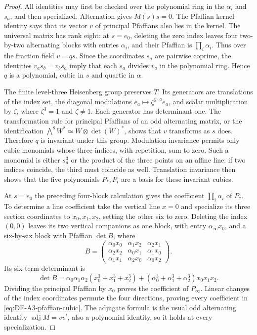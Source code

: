 \begin{proof}
All identities may first be checked over the polynomial ring in the
$\alpha_i$ and $s_a$, and then specialized.  Alternation gives $M(s)s=0$.
The Pfaffian kernel identity says that its vector $v$ of principal
Pfaffians also lies in the kernel.  The universal matrix has rank eight:
at $s=e_0$, deleting the zero index leaves four two-by-two alternating
blocks with entries $\alpha_i$, and their Pfaffian is
$\prod_i\alpha_i$.  Thus over the fraction field $v=q s$.
Since the coordinates $s_a$ are pairwise coprime, the identities
$v_as_b=v_bs_a$ imply that each $s_a$ divides $v_a$ in the polynomial
ring.  Hence $q$ is a polynomial, cubic in $s$ and quartic in $\alpha$.

The finite level-three Heisenberg group preserves $T$.  Its generators
are translations of the index set, the diagonal modulations
$e_a\mapsto\zeta^{y\cdot a}e_a$, and scalar multiplication by
$\zeta$, where $\zeta^3=1$ and $\zeta\ne1$.  Each generator has
determinant one.  The transformation rule for principal Pfaffians of
an odd alternating matrix, or the identification
$\bigwedge^8W^*\simeq W\otimes\det(W)^*$, shows that $v$ transforms
as $s$ does.  Therefore $q$ is invariant under this group.
Modulation invariance permits only cubic monomials whose three indices,
with repetition, sum to zero.  Such a monomial is either $s_a^3$ or the
product of the three points on an affine line: if two indices coincide,
the third must coincide as well.  Translation invariance then shows
that the five polynomials $P_*,P_i$ are a basis for these invariant
cubics.

At $s=e_0$ the preceding four-block calculation gives the coefficient
$\prod_i\alpha_i$ of $P_*$.  To determine a line coefficient take the
vertical line $x=0$ and specialize its three section coordinates to
$x_0,x_1,x_2$, setting the other six to zero.  Deleting the index
$(0,0)$ leaves its two vertical companions as one block, with entry
$\alpha_\infty x_0$, and a six-by-six block with Pfaffian $\det B$, where
\[
 B=\begin{pmatrix}
 \alpha_0x_0&\alpha_1x_2&\alpha_2x_1\\
 \alpha_2x_2&\alpha_0x_1&\alpha_1x_0\\
 \alpha_1x_1&\alpha_2x_0&\alpha_0x_2
 \end{pmatrix}.
\]
Its six-term determinant is
\[
 \det B=\alpha_0\alpha_1\alpha_2(x_0^3+x_1^3+x_2^3)
       +(\alpha_0^3+\alpha_1^3+\alpha_2^3)x_0x_1x_2.
\]
Dividing the principal Pfaffian by $x_0$ proves the coefficient of
$P_\infty$.  Linear changes of the index coordinates permute the four
directions, proving every coefficient in
\eqref{eq:DE-A3-pfaffian-cubic}.  The adjugate formula is the usual
odd alternating identity $\operatorname{adj}M=vv^t$, also a polynomial
identity, so it holds at every specialization.


\end{proof}

